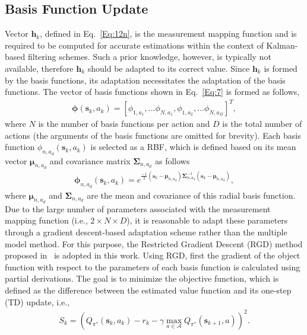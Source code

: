 \documentclass{ieeeaccess}
\def\mA{\mathcal{A}}
\def\k{_{k}}
\def\nk{_{k+1}}
\def\bmu{\bm{\mu}}
\def\h{\bm{h}}
\def\u{\bm{\mu}}
\def\Sig{\bm{\Sigma}}
\def\s{\bm{s}}
\def\S{S}
\begin{document}
\subsection{Basis Function Update}\label{Sec:RBFs}
Vector $\h\k$, defined in Eq.~\eqref{Eq:12n}, is the measurement mapping function and is required to be computed for accurate estimations within the context of Kalman-based filtering schemes. Such a prior knowledge, however, is typically not available, therefore $\h\k$ should be adapted to its correct value. Since $\h\k$ is formed by the basis functions, its adaptation necessitates the adaptation of the basis functions. The vector of basis functions shown in Eq.~\eqref{Eq:7} is formed as follows,
%
\begin{eqnarray}
\bm{\phi}(\s\k,a\k) = [\phi_{1,a_1},\ldots \phi_{N,a_1}, \phi_{1,a_2}, \ldots \phi_{N,a_D}]^T,\label{Eq:28}
\end{eqnarray}
%
where $N$ is the number of basis functions per action and $D$ is the total number of actions (the arguments of the basis functions are omitted for brevity). Each basis function ${\phi}_{n,a_d}(\s\k,a\k)$ is selected as a RBF, which is defined based on its mean vector $\bmu_{n,a_d}$ and covariance matrix $\Sig_{n,a_d}$ as follows
%
\begin{eqnarray}
\bm{\phi}_{n, a_d}(\s\k,a\k) = e^{\frac{-1}{2}(\s\k-\u_{n, a_d})\bm{\Sigma}^{-1}_{n,a_d}(\s\k-\u_{n, a_d})},\label{Eq:29}
\end{eqnarray}
%
where $\u_{n, a_d}$ and $\bm{\Sigma}_{n, a_d}$ are the mean and covariance of this radial basis function. Due to the large number of parameters associated with the measurement mapping function (i.e., $2 \times N \times D$), it is reasonable to adapt these parameters through a gradient descent-based adaptation scheme rather than the multiple model method. For this purpose, the Restricted Gradient Descent (RGD) method proposed in~\cite{18} is adopted in this work. Using RGD, first the gradient of the object function with respect to the parameters of each basis function is calculated using partial derivations. The goal is to minimize the objective function, which is defined as the difference between the estimated value function and its one-step (TD) update, i.e.,
%
\begin{eqnarray}
\S\k = \left( Q_{\pi^*}(\s\k, a\k) -r\k -\gamma\max_{a \in \mA} Q_{\pi^*}(\s\nk, a)\right)^2. \label{Eq:30}
\end{eqnarray}
\end{document}
